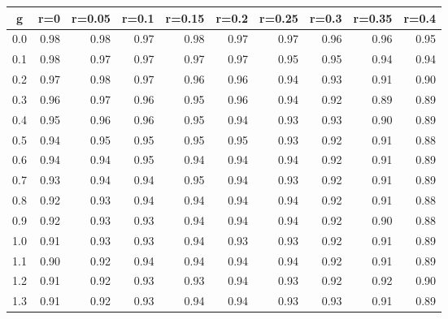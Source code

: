 %
\begin{table}[!tbp]
 \begin{center}
 \begin{tabular}{rrrrrrrrrr}\hline\hline
\multicolumn{1}{c}{g}&\multicolumn{1}{c}{r=0}&\multicolumn{1}{c}{r=0.05}&\multicolumn{1}{c}{r=0.1}&\multicolumn{1}{c}{r=0.15}&\multicolumn{1}{c}{r=0.2}&\multicolumn{1}{c}{r=0.25}&\multicolumn{1}{c}{r=0.3}&\multicolumn{1}{c}{r=0.35}&\multicolumn{1}{c}{r=0.4}\tabularnewline
\hline
0.0&0.98&0.98&0.97&0.98&0.97&0.97&0.96&0.96&0.95\tabularnewline
0.1&0.98&0.97&0.97&0.97&0.97&0.95&0.95&0.94&0.94\tabularnewline
0.2&0.97&0.98&0.97&0.96&0.96&0.94&0.93&0.91&0.90\tabularnewline
0.3&0.96&0.97&0.96&0.95&0.96&0.94&0.92&0.89&0.89\tabularnewline
0.4&0.95&0.96&0.96&0.95&0.94&0.93&0.93&0.90&0.89\tabularnewline
0.5&0.94&0.95&0.95&0.95&0.95&0.93&0.92&0.91&0.88\tabularnewline
0.6&0.94&0.94&0.95&0.94&0.94&0.94&0.92&0.91&0.89\tabularnewline
0.7&0.93&0.94&0.94&0.95&0.94&0.93&0.92&0.91&0.89\tabularnewline
0.8&0.92&0.93&0.94&0.94&0.94&0.94&0.92&0.91&0.88\tabularnewline
0.9&0.92&0.93&0.93&0.94&0.94&0.94&0.92&0.90&0.88\tabularnewline
1.0&0.91&0.93&0.93&0.94&0.93&0.93&0.92&0.91&0.89\tabularnewline
1.1&0.90&0.92&0.94&0.94&0.94&0.94&0.92&0.91&0.89\tabularnewline
1.2&0.91&0.92&0.93&0.93&0.94&0.93&0.92&0.92&0.90\tabularnewline
1.3&0.91&0.92&0.93&0.94&0.94&0.93&0.93&0.91&0.89\tabularnewline
\hline
\end{tabular}

\end{center}

\end{table}

